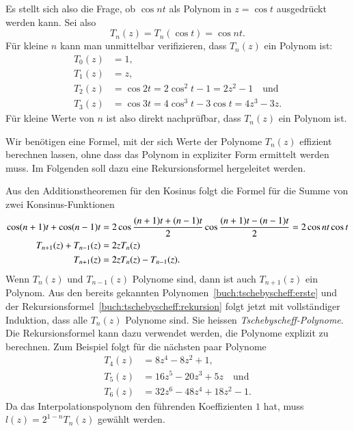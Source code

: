 Es stellt sich also die Frage, ob $\cos nt$ als Polynom in $z=\cos t$
ausgedrückt werden kann.
Sei also
\[
T_n(z)
=
T_n(\cos t)
= 
\cos nt.
\]
Für kleine $n$ kann man unmittelbar verifizieren, dass $T_n(z)$ ein
Polynom ist:
\begin{equation}
\begin{aligned}
T_0(z) &= 1,\\
T_1(z) &= z,\\
T_2(z) &= \cos 2t = 2\cos^2 t-1 = 2z^2 -1
\quad\text{und}
\\
T_3(z) &= \cos 3t = 4\cos^3 t - 3\cos t = 4z^3-3z.
\end{aligned}
\label{buch:tschebyscheff:erste}
\end{equation}
Für kleine Werte von $n$ ist also direkt nachprüfbar, dass $T_n(z)$
ein Polynom ist.

Wir benötigen eine Formel, mit der sich Werte der Polynome $T_n(z)$
effizient berechnen lassen, ohne dass das Polynom in expliziter
Form ermittelt werden muss.
Im Folgenden soll dazu eine Rekursionsformel hergeleitet werden.

Aus den Additionstheoremen für den Kosinus folgt die Formel für die
Summe von zwei Konsinus-Funktionen
\begin{align}
\cos (n+1)t + \cos(n-1)t
&=
2 \cos \frac{(n+1)t + (n-1)t}2 \cos \frac{(n+1)t -(n-1)t}2
=
2\cos nt \cos t
\notag
\\
T_{n+1}(z)+T_{n-1}(z)&=2zT_n(z)
\notag
\\
T_{n+1}(z) &= 2zT_n(z) - T_{n-1}(z).
\label{buch:tschebyscheff:rekursion}
\end{align}
Wenn $T_n(z)$ und $T_{n-1}(z)$ Polynome sind, dann ist auch $T_{n+1}(z)$
ein Polynom.
Aus den bereits gekannten Polynomen~\eqref{buch:tschebyscheff:erste} und
der Rekursionsformel~\eqref{buch:tschebyscheff:rekursion} folgt jetzt mit
vollständiger Induktion, dass alle $T_n(z)$ Polynome sind.
Sie heissen {\em Tschebyscheff-Polynome}.
Die Rekursionsformel kann dazu verwendet werden, die Polynome explizit
zu berechnen.
Zum Beispiel folgt für die nächsten paar Polynome
\begin{align*}
T_4(z) &= 8z^4-8z^2 + 1,
\\
T_5(z) &= 16z^5-20z^3+5z \quad\text{und}
\\
T_6(z) &= 32z^6-48z^4+18z^2-1.
\end{align*}
Da das Interpolationspolynom den führenden Koeffizienten $1$ hat,
muss $l(z) = 2^{1-n}T_n(z)$ gewählt werden.

